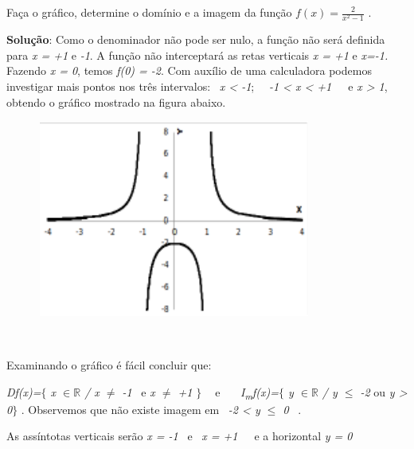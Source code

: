 \begin{texemplo}
Faça o gráfico, determine o domínio e a imagem da função  \( f \left( x \right) =\frac{2}{x^{2}-1} \) .

\textbf{Solução}: Como o denominador não pode ser nulo, a função não será definida para \textit{x = +1 }e\textit{ -1}.  A função não interceptará as retas verticais \textit{x = +1 }e\textit{ x=-1. }Fazendo \textit{x = 0}, temos \textit{f(0) = -2}. Com auxílio de uma calculadora podemos investigar mais pontos nos três intervalos:~ \textit{x < -1};~~ \textit{-1 < x < +1}~~~e  \textit{x > 1}, obtendo o gráfico mostrado na figura abaixo. 

\begin{figure}[H]
	\begin{Center}
		\includegraphics[width=3.55in,height=2.55in]{capitulos/outras_funcoes/media/image12.pdf}
	\end{Center}
\end{figure}

~~

\quad Examinando o gráfico é fácil concluir que: 

\quad \textit{Df(x)=$ \{ $  x $ \in \mathbb{R} $  \textbf{ }/ x $ \neq $  -1} ~e  \textit{x $ \neq $  +1\textbf{ }$ \} $ ~ } e~~~  \textit{I\textsubscript{m}f(x)=$ \{ $ y $ \in \mathbb{R} $   / y $ \leq $  -2 }ou\textit{ y > 0$ \} $ }. Observemos que não existe imagem em~ \textit{-2 < y $ \leq $  0}~ .

\quad As assíntotas verticais serão \textit{x = -1}~ e~ \textit{x = +1}~~~e a horizontal  \textit{y = 0} \textit{ }\qedsymbol{} 
\end{texemplo}

